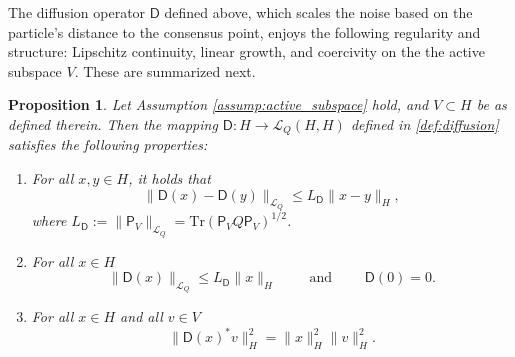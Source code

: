 \documentclass[12pt]{amsart}
\numberwithin{equation}{section}
\newtheorem{proposition}[theorem]{Proposition}
\begin{document}
The diffusion operator $\mathsf{D}$ defined above, which scales the noise based on the particle's distance to the consensus point, enjoys the following regularity and structure: Lipschitz continuity, linear growth, and coercivity on the the active subspace $V$. These are summarized next.

\begin{proposition}
\label{prop:diffusion}
Let Assumption \ref{assump:active_subspace} hold, and $V\subset H$ be as defined therein.  
Then the mapping $\mathsf{D}: H \to \mathscr{L}_Q(H, H)$ defined in \eqref{def:diffusion} satisfies the following properties:

\begin{enumerate}
    \item 
    For all $x, y \in H$, it holds that
    \begin{equation*}
        \|\mathsf{D}(x) - \mathsf{D}(y)\|_{\mathscr{L}_Q} \leq   L_{\mathsf{D}} \|x - y\|_H,
    \end{equation*}
    where $L_{\mathsf{D}}:=\|\mathsf{P}_V\|_{\mathscr{L}_Q}=\mathrm{Tr}(\mathsf{P}_V Q \mathsf{P}_V)^{1/2}$.
    
    \item 
    For all $x\in H$
    \begin{equation*}
        \|\mathsf{D}(x)\|_{\mathscr{L}_Q} \leq  L_{\mathsf{D}}\|x\|_H \qquad \text{ and } \qquad \mathsf{D}(0) = 0.
    \end{equation*}

    
    \item  
    For all $x \in H$ and all $v \in V$
    \begin{equation*}
        \|\mathsf{D}(x)^* v\|_H^2 =  \|x\|_H^2 \|v\|_H^2.
    \end{equation*}
\end{enumerate}
\end{proposition}
\end{document}
